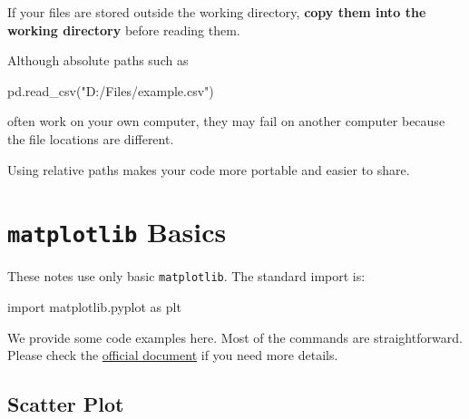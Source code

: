 \documentclass[
  letterpaper,
  DIV=11,
  numbers=noendperiod]{scrreprt}
\newenvironment{Shaded}{\begin{snugshade}}{\end{snugshade}}
\newcommand{\ImportTok}[1]{\textcolor[rgb]{0.00,0.46,0.62}{#1}}
\newcommand{\NormalTok}[1]{\textcolor[rgb]{0.00,0.23,0.31}{#1}}
\newcommand{\StringTok}[1]{\textcolor[rgb]{0.13,0.47,0.30}{#1}}
\theoremstyle{definition}
\theoremstyle{definition}
\theoremstyle{plain}
\theoremstyle{plain}
\theoremstyle{remark}
\begin{document}
If your files are stored outside the working directory, \textbf{copy
them into the working directory} before reading them.

\begin{tcolorbox}[enhanced jigsaw, arc=.35mm, bottomrule=.15mm, bottomtitle=1mm, breakable, colback=white, colbacktitle=quarto-callout-note-color!10!white, colframe=quarto-callout-note-color-frame, coltitle=black, left=2mm, leftrule=.75mm, opacityback=0, opacitybacktitle=0.6, rightrule=.15mm, title=\textcolor{quarto-callout-note-color}{\faInfo}\hspace{0.5em}{Note}, titlerule=0mm, toprule=.15mm, toptitle=1mm]

Although absolute paths such as

\begin{Shaded}
\begin{Highlighting}[]
\NormalTok{pd.read\_csv(}\StringTok{"D:/Files/example.csv"}\NormalTok{)}
\end{Highlighting}
\end{Shaded}

often work on your own computer, they may fail on another computer
because the file locations are different.

Using relative paths makes your code more portable and easier to share.

\end{tcolorbox}

\section{\texorpdfstring{\texttt{matplotlib}
Basics}{matplotlib Basics}}\label{matplotlib-basics}

These notes use only basic \texttt{matplotlib}. The standard import is:

\begin{Shaded}
\begin{Highlighting}[]
\ImportTok{import}\NormalTok{ matplotlib.pyplot }\ImportTok{as}\NormalTok{ plt}
\end{Highlighting}
\end{Shaded}

We provide some code examples here. Most of the commands are
straightforward. Please check the
\href{https://matplotlib.org/}{official document} if you need more
details.

\subsection{Scatter Plot}\label{scatter-plot}
\end{document}
